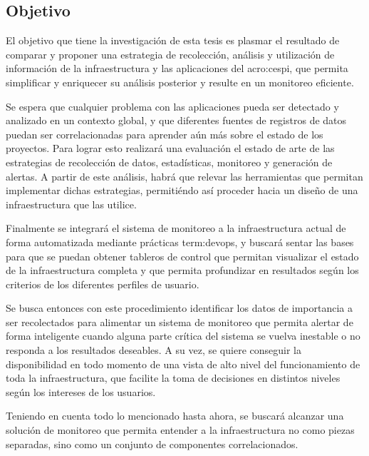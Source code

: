 \subsection{Objetivo}
\label{objetivo}

El objetivo que tiene la investigación de esta tesis es plasmar el resultado de
comparar y proponer una estrategia de recolección, análisis y utilización de
información de la infraestructura y las aplicaciones del \gls{acro:cespi}, que
permita simplificar y enriquecer su análisis posterior y resulte en un
monitoreo eficiente.

Se espera que cualquier problema con las aplicaciones pueda ser detectado y
analizado en un contexto global, y que diferentes fuentes de registros de datos
puedan ser correlacionadas para aprender aún más sobre el estado de los
proyectos. Para lograr esto realizará una evaluación el estado de arte de las
estrategias de recolección de datos, estadísticas, monitoreo y generación de
alertas.  A partir de este análisis, habrá que relevar las herramientas que
permitan implementar dichas estrategias, permitiéndo así proceder hacia un
diseño de una infraestructura que las utilice.

Finalmente se integrará el sistema de monitoreo a la infraestructura actual de
forma automatizada mediante prácticas \gls{term:devops}, y buscará sentar las
bases para que se puedan obtener tableros de control que permitan visualizar el
estado de la infraestructura completa y que permita profundizar en resultados
según los criterios de los diferentes perfiles de usuario.

Se busca entonces con este procedimiento identificar los datos de importancia a
ser recolectados para alimentar un sistema de monitoreo que permita alertar de
forma inteligente cuando alguna parte crítica del sistema se vuelva inestable o
no responda a los resultados deseables. A su vez, se quiere conseguir la
disponibilidad en todo momento de una vista de alto nivel del funcionamiento de
toda la infraestructura, que facilite la toma de decisiones en distintos
niveles según los intereses de los usuarios.

Teniendo en cuenta todo lo mencionado hasta ahora, se buscará alcanzar una
solución de monitoreo que permita entender a la infraestructura no como piezas
separadas, sino como un conjunto de componentes correlacionados.
